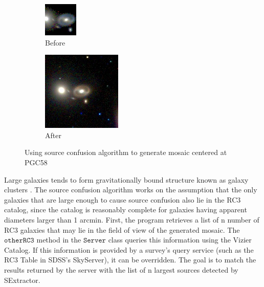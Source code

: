 \documentclass[5p]{elsarticle}
\begin{document}
%
%
%
\begin{figure}
\begin{subfigure}{.3\textwidth}
\centering
  \includegraphics[width=.4\linewidth]{figures/PGC58b4SC}
  \caption{Before}
\end{subfigure}%
\begin{subfigure}{.3\textwidth}
\centering
  \includegraphics[width=.4\linewidth]{figures/PGC58afterSC}
  \caption{After} 
\end{subfigure}
\caption{Using source confusion algorithm to generate mosaic centered at PGC58}
\label{fig:SCdemo}
\end{figure}
\indent Large galaxies tends to form gravitationally bound structure known as galaxy clusters . The source confusion algorithm works on the assumption that the only galaxies that are large enough to cause source confusion also lie in the RC3 catalog, since the catalog is reasonably complete for galaxies having apparent diameters larger than 1 arcmin. First, the program retrieves a list of n number of RC3 galaxies that may lie in the field of view of the generated mosaic. The $\texttt{otherRC3}$ method in the $\texttt{Server}$ class queries this information using the Vizier Catalog. If this information is provided by a survey's query service (such as the RC3 Table in SDSS's SkyServer), it can be overridden. The goal is to match the results returned by the server with the list of n largest sources detected by SExtractor. 
\end{document}
